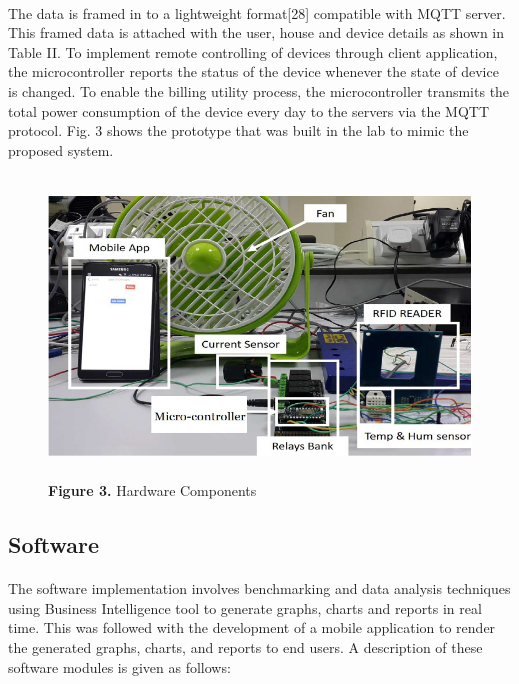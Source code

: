 \documentclass[a4paper,12pt,oneside]{article}
\let\counterwithin\relax
\begin{document}
\paragraph{}
The data is framed in to a lightweight format[28] compatible with MQTT server. This
framed data is attached with the user, house and device details
as shown in Table II. To implement remote controlling of
devices through client application, the microcontroller reports
the status of the device whenever the state of device is
changed. To enable the billing utility process, the
microcontroller transmits the total power consumption of the
device every day to the servers via the MQTT protocol. Fig. 3
shows the prototype that was built in the lab to mimic the
proposed system.
\begin{figure}[H]
\includegraphics[height=8cm,width=16cm]{Figure3.png}
\centering
\caption[Hardware Components]{\textbf{Figure 3.} Hardware Components}
\end{figure}

\subsection{Software}
\paragraph{}
The software implementation involves benchmarking and
data analysis techniques using Business Intelligence tool to
generate graphs, charts and reports in real time. This was
followed with the development of a mobile application to
render the generated graphs, charts, and reports to end users. A
description of these software modules is given as follows:
\end{document}
